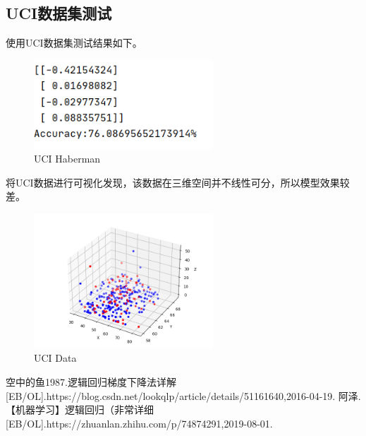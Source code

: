 \documentclass[a4paper,11pt,UTF8]{ctexart}
\newcommand{\bottomcaption}{%
\setlength{\abovecaptionskip}{6pt}%
\setlength{\belowcaptionskip}{6pt}%
\caption}
\begin{document}
\subsection{UCI数据集测试}
使用UCI数据集测试结果如下。
\begin{figure}[htbp]
  \centering
  \includegraphics[width=0.6\textwidth]{img_4.png}
  \bottomcaption{UCI Haberman}
\end{figure}
将UCI数据进行可视化发现，该数据在三维空间并不线性可分，所以模型效果较差。
\begin{figure}[htbp]
  \centering
  \includegraphics[width=0.6\textwidth]{img_5.png}
  \bottomcaption{UCI Data}
\end{figure}
\begin{thebibliography}{99} 
空中的鱼1987.逻辑回归梯度下降法详解[EB/OL].https://blog.csdn.net/lookqlp/article/details/51161640,2016-04-19.
阿泽.【机器学习】逻辑回归（非常详细[EB/OL].https://zhuanlan.zhihu.com/p/74874291,2019-08-01.
\end{thebibliography}

\end{document}
